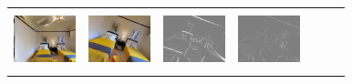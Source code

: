 \documentclass[letterpaper, 10 pt, conference]{ieeeconf}  %
\begin{document}
\begin{figure}[h!]
\begin{center}
\begin{tabular}{|c| c |c | c | c | c | c|}
  \includegraphics[width=18mm, height=17mm]{TrueDepth/ARKANSAW/init.png} &   
            \includegraphics[width=18mm, height=17mm]{TrueDepth/ARKANSAW/des.png} & 
           \includegraphics[width=18mm, height=17mm]{PhotoVS/ARKANSAW/ferror.png} & \includegraphics[width=18mm, height=17mm]{ICRA17/ARKANSAW/ferror.png} & 


\end{tabular}
\end{center}
\end{figure}
\end{document}
